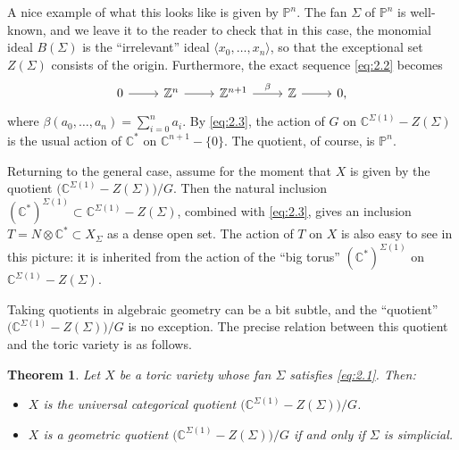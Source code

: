 \documentclass{amsart}
\theoremstyle{plain}
\newtheorem{theorem}{Theorem}[section]
\theoremstyle{definition}
\begin{document}
	A nice example of what this looks like is given by $\mathbb{P}^n$.  The fan $\Sigma$ of $\mathbb{P}^n$ is well-known, and we leave
it to the reader to check that in this case, the monomial ideal
$B(\Sigma)$ is the ``irrelevant'' ideal $\langle
x_0,\ldots,x_n\rangle$, so that the exceptional set $Z(\Sigma)$
consists of the origin.  Furthermore, the exact sequence \eqref{eq:2.2}
becomes
\[
\begin{tikzcd}
0 \arrow[r] & \mathbb{Z}^n \arrow[r] & \mathbb{Z}^{n+1} \arrow[r, "\beta"] & \mathbb{Z} \arrow[r] & 0,
\end{tikzcd}
\]
where $\beta(a_0,\ldots,a_n) = \sum_{i=0}^n a_i$.  By
\eqref{eq:2.3}, the action of $G$ on $\mathbb{C}^{\Sigma(1)}
-Z(\Sigma)$ is the usual action of $\mathbb{C}^*$ on $\mathbb{C}^{n+1} -
\{0\}$.  The quotient, of course, is $\mathbb{P}^n$.

	Returning to the general case, assume for the moment that $X$
is given by the quotient $\big(\mathbb{C}^{\Sigma(1)}
-Z(\Sigma)\big)/G$.  Then the natural inclusion $ (\mathbb{C}^*)^{\Sigma(1)} \subset \mathbb{C}^{\Sigma(1)} -Z(\Sigma)$, combined
with \eqref{eq:2.3}, gives an inclusion $T = N\otimes\mathbb{C}^* \subset
X_\Sigma$ as a dense open set.  The action of $T$ on $X$ is also easy
to see in this picture: it is inherited from the action of the ``big
torus'' $(\mathbb{C}^*)^{\Sigma(1)}$ on $\mathbb{C}^{\Sigma(1)}
-Z(\Sigma)$.

	Taking quotients in algebraic geometry can be a bit subtle,
and the ``quotient'' $\big(\mathbb{C}^{\Sigma(1)} -Z(\Sigma)\big)/G$ is
no exception.  The precise relation between this quotient and the
toric variety is as follows.

\begin{theorem} Let $X$ be a toric variety whose fan $\Sigma$
satisfies \eqref{eq:2.1}.  Then:
\begin{itemize}
\item $X$ is the universal categorical quotient $\big(\mathbb{C}^{\Sigma(1)} -Z(\Sigma)\big)/G$.  
\item $X$ is a geometric quotient  $\big(\mathbb{C}^{\Sigma(1)}
-Z(\Sigma)\big)/G$ if and only if $\Sigma$ is simplicial. 
\end{itemize}
\end{theorem}
\end{document}
